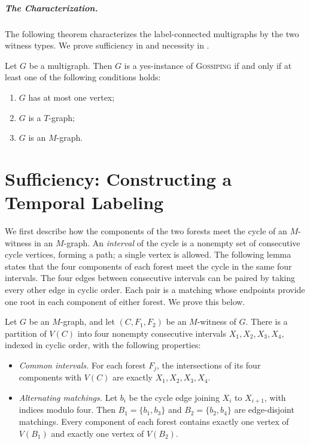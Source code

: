 \documentclass[USenglish, a4paper, thm-restate,numberwithinsect, cleveref]{lipics-v2021}
\newcommand{\Gossip}{\textnormal{\textsc{Gossiping}}\xspace}
\begin{document}
\subparagraph*{The Characterization.}
The following theorem characterizes the label-connected multigraphs
by the two witness types. We prove sufficiency in
 and necessity in
.
\label{sec:witnesses}

\begin{theorem}\label{thm:characterization}
Let $G$ be a multigraph. Then $G$ is a yes-instance of \Gossip if and only
if at least one of the following conditions holds:
\begin{enumerate}
\item\label{Gtrivial} $G$ has at most one vertex;
\item\label{GisT} $G$ is a $T$-graph;
\item\label{GisM} $G$ is an $M$-graph.
\end{enumerate}
\end{theorem}


\section{Sufficiency: Constructing a Temporal Labeling}
\label{app:construct-labeling}

We first describe how the components of the two forests meet the
cycle of an $M$-witness in an $M$-graph. An \emph{interval} of the
cycle is a nonempty set of consecutive cycle vertices, forming a
path; a single vertex is allowed. The following lemma states that
the four components of each forest meet the cycle in the same four
intervals. The four edges between consecutive intervals can be paired
by taking every other edge in cyclic order. Each pair is a matching
whose endpoints provide one root in each component of either forest.
We prove this below.

\begin{lemma}\label{lem:four-intervals}
Let $G$ be an $M$-graph, and let $(C,F_1,F_2)$ be an $M$-witness of $G$.
There is a partition of $V(C)$ into four nonempty consecutive intervals
$X_1,X_2,X_3,X_4$, indexed in cyclic order, with the following properties:
\label{lem:structured-m-witness}%
\begin{itemize}
\item \emph{Common intervals.} For each forest $F_j$, the intersections
of its four components with $V(C)$ are exactly $X_1,X_2,X_3,X_4$.
\item \emph{Alternating matchings.} Let $b_i$ be the cycle edge joining
$X_i$ to $X_{i+1}$, with indices modulo four. Then
$B_1=\{b_1,b_3\}$ and $B_2=\{b_2,b_4\}$ are edge-disjoint matchings.
Every component of each forest contains exactly one vertex of $V(B_1)$
and exactly one vertex of $V(B_2)$.
\end{itemize}
\end{lemma}
\end{document}
